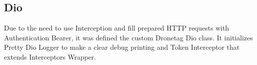 \subsection{Dio}\label{subsec:dio-class}
Due to the need to use Interception and fill prepared HTTP requests with Authentication Bearer, it was defined the custom Dronetag Dio class.
It initializes Pretty Dio Logger to make a clear debug printing and Token Interceptor that extends Interceptors Wrapper.
